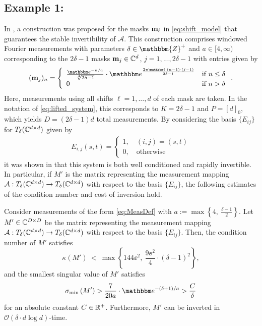 \subsection*{Example 1:} 
In \cite{IVW2015_FastPhase}, a construction was proposed for the masks $\mathbf m_\ell$ in \eqref{eq:shift_model} that guarantees the stable invertibility of $\mathcal{A}$.  This construction comprises windowed Fourier measurements with parameters $\delta \in \mathbbm{Z}^+$ and $a \in [4, \infty)$ corresponding to the $2\delta-1$ masks $\mathbf m_j\in\mathbb{C}^d$, $j=1,...,2\delta-1$ with entries given by
%
\begin{equation}
(\m_j)_{n} = \left\{ \begin{array}{ll}
    \frac{\ee^{-n/a}}{\sqrt[4]{2\delta -1}} \cdot
    \ee^{\frac{2 \pi \ii \cdot (n - 1) \cdot (j -1)}
    {2\delta - 1}} & \textrm{if}~n \leq \delta \\ 
    0 & \textrm{if}~n >  \delta\end{array} \right. .
    \label{eq:MeasDef}
\end{equation}
%
Here, measurements using all shifts $\ell = 1,..., d$ of each mask are taken.  In the notation of \eqref{eq:lifted_system}, this corresponds to  $K = 2\delta - 1$ and $P = [d]_0$, which yields $D = (2\delta - 1)d$ total measurements.  By considering the basis $\{E_{ij}\}$ for $T_\delta(\mathbb{C}^{d \times d})$ given by %
\begin{align}\nonumber
E_{i,j}(s,t) =\left\{\begin{array}{l} 1, \quad (i,j)=(s,t)\\ 0, \quad \text{otherwise}\end{array}\right.
\end{align}
it was shown in \cite{IVW2015_FastPhase} that this system is both well conditioned and rapidly invertible.  In particular, if $M'$ is the matrix representing the measurement mapping $\mathcal{A} : T_{\delta}(\mathbb{C}^{d \times d}) \to T_{\delta}(\mathbb{C}^{d \times d})$ with respect to the basis $\{E_{ij}\}$, the following estimates of the condition number and cost of inversion hold.

\begin{theorem}
Consider measurements of the form \eqref{eq:MeasDef} with $a:= \max \left\{ 4,~\frac{\delta - 1}{2} \right\}$.  Let $M' \in \mathbb{C}^{D \times D}$ be the matrix representing the measurement mapping $\mathcal{A} : T_{\delta}(\mathbb{C}^{d \times d}) \to T_{\delta}(\mathbb{C}^{d \times d})$ with respect to the basis $\{E_{ij}\}$.  Then, the condition number of $M'$ satisfies $$\kappa \left( M' \right) ~<~ \max \left\{ 144 \ee^2,~\frac{9 \ee^2}{4} \cdot (\delta - 1)^2 \right \},$$
%
and the smallest singular value of $M'$ satisfies
%
$$\sigma_{\rm min} \left( M' \right) > \frac{7}{20 a} \cdot \ee^{-(\delta + 1)/a} > \frac{C}{\delta}$$
%
for an absolute constant $C \in \mathbb{R}^+$.  Furthermore, $M'$ can be inverted in $\mathcal{O} \left( \delta \cdot d \log d \right)$-time.
\label{thm:WellCondMeas}
\end{theorem}

